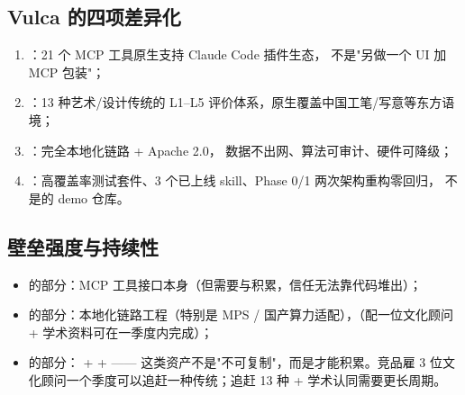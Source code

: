 \subsection{Vulca 的四项差异化}

\begin{enumerate}
  \item {}：21 个 MCP 工具原生支持 Claude Code 插件生态，
  不是"另做一个 UI 加 MCP 包装"；
  \item {}：13 种艺术/设计传统的 L1–L5 评价体系，原生覆盖中国工笔/写意等东方语境；
  \item {}：完全本地化链路 + Apache 2.0，
  数据不出网、算法可审计、硬件可降级；
  \item {}：高覆盖率测试套件、3 个已上线 skill、Phase 0/1 两次架构重构零回归，
  不是的 demo 仓库。
\end{enumerate}

\subsection{壁垒强度与持续性}

\begin{itemize}
  \item {}的部分：MCP 工具接口本身（但需要与积累，信任无法靠代码堆出）；
  \item {}的部分：本地化链路工程（特别是 MPS / 国产算力适配），（配一位文化顾问 + 学术资料可在一季度内完成）；
  \item {}的部分： +  + ——
  这类资产不是"不可复制"，而是才能积累。竞品雇 3 位文化顾问一个季度可以追赶一种传统；追赶 13 种 + 学术认同需要更长周期。
\end{itemize}
